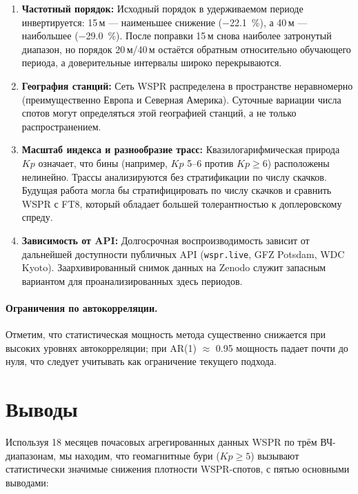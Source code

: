 \documentclass{agujournal2019}
\begin{document}
\begin{enumerate}
	      при наибольшем $Kp$.
	\item \textbf{Частотный порядок:} Исходный порядок в удерживаемом периоде
	      инвертируется: 15\,м — наименьшее снижение (\SI{-22.1}{\percent}),
	      а 40\,м — наибольшее (\SI{-29.0}{\percent}). После поправки 15\,м
	      снова наиболее затронутый диапазон, но порядок 20\,м/40\,м
	      остаётся обратным относительно обучающего периода, а доверительные
	      интервалы широко перекрываются.
	\item \textbf{География станций:} Сеть WSPR распределена в пространстве
	      неравномерно (преимущественно Европа и Северная Америка).
	      Суточные вариации числа спотов могут определяться этой географией
	      станций, а не только распространением.
	\item \textbf{Масштаб индекса и разнообразие трасс:} Квазилогарифмическая
	      природа $Kp$ означает, что бины (например, $Kp$ 5--6 против
	      $Kp \ge 6$) расположены нелинейно. Трассы анализируются без
	      стратификации по числу скачков. Будущая работа могла бы
	      стратифицировать по числу скачков и сравнить WSPR с FT8,
	      который обладает большей толерантностью к доплеровскому спреду.
	\item \textbf{Зависимость от API:} Долгосрочная воспроизводимость
	      зависит от дальнейшей доступности публичных API
	      (\texttt{wspr.live}, GFZ Potsdam, WDC Kyoto). Заархивированный
	      снимок данных на Zenodo служит запасным вариантом для
	      проанализированных здесь периодов.
\end{enumerate}


\paragraph{Ограничения по автокорреляции.}
Отметим, что статистическая мощность метода существенно снижается при высоких уровнях автокорреляции; при AR(1) $\approx$ 0.95 мощность падает почти до нуля, что следует учитывать как ограничение текущего подхода.


\section{Выводы}

Используя 18 месяцев почасовых агрегированных данных WSPR по трём
ВЧ-диапазонам, мы находим, что геомагнитные бури ($Kp \ge 5$) вызывают
статистически значимые снижения плотности WSPR-спотов, с пятью основными
выводами:
\end{document}
